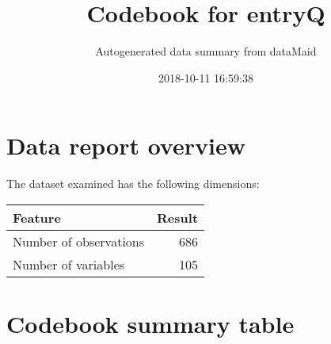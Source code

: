 \documentclass[]{article}
\title{Codebook for entryQ}
\subtitle{Autogenerated data summary from dataMaid}
\author{}
\date{2018-10-11 16:59:38}
\begin{document}
\maketitle

\section{Data report overview}\label{data-report-overview}

The dataset examined has the following dimensions:

\begin{longtable}[]{@{}lr@{}}
\toprule
\begin{minipage}[b]{0.33\columnwidth}\raggedright\strut
Feature\strut
\end{minipage} & \begin{minipage}[b]{0.10\columnwidth}\raggedleft\strut
Result\strut
\end{minipage}\tabularnewline
\midrule
\endhead
\begin{minipage}[t]{0.33\columnwidth}\raggedright\strut
Number of observations\strut
\end{minipage} & \begin{minipage}[t]{0.10\columnwidth}\raggedleft\strut
686\strut
\end{minipage}\tabularnewline
\begin{minipage}[t]{0.33\columnwidth}\raggedright\strut
Number of variables\strut
\end{minipage} & \begin{minipage}[t]{0.10\columnwidth}\raggedleft\strut
105\strut
\end{minipage}\tabularnewline
\bottomrule
\end{longtable}

\section{Codebook summary table}\label{codebook-summary-table}
\end{document}
